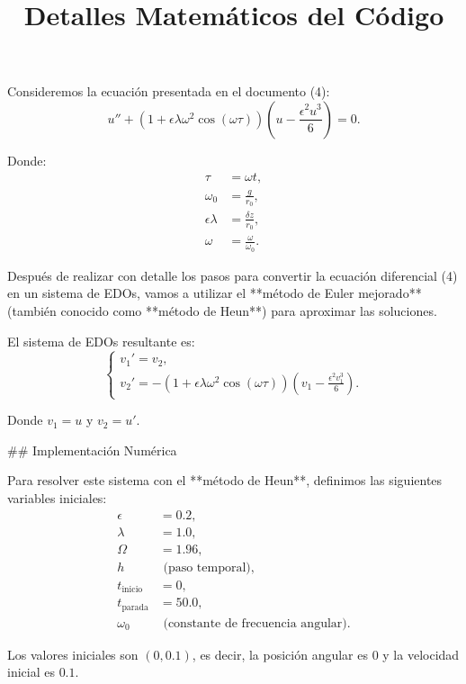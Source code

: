 \documentclass{article}
\title{Detalles Matemáticos del Código}
\author{}
\date{}
\begin{document}
\maketitle

Consideremos la ecuación presentada en el documento (4):
\begin{equation}
    u''+(1+\epsilon \lambda \omega^2 \cos(\omega \tau))\left(u - \frac{\epsilon^2 u^3}{6}\right) = 0.
\end{equation}

Donde:
\begin{align*}
    \tau &= \omega t, \\
    \omega_0 &= \frac{g}{r_0}, \\
    \epsilon \lambda &= \frac{\delta z}{r_0}, \\
    \omega &= \frac{\omega}{\omega_0}.
\end{align*}

Después de realizar con detalle los pasos para convertir la ecuación diferencial (4) en un sistema de EDOs, vamos a utilizar el **método de Euler mejorado** (también conocido como **método de Heun**) para aproximar las soluciones.

El sistema de EDOs resultante es:
\begin{equation}
    \begin{cases}
        v_1' = v_2,  \\
        v_2' = -(1+\epsilon \lambda \omega^2 \cos(\omega \tau))\left(v_1 - \frac{\epsilon^2 v_1^3}{6}\right).
    \end{cases}
\end{equation}

Donde $v_1 = u$ y $v_2 = u'$. 

## Implementación Numérica

Para resolver este sistema con el **método de Heun**, definimos las siguientes variables iniciales:
\begin{align*}
    \epsilon &= 0.2, \\
    \lambda &= 1.0, \\
    \Omega &= 1.96, \\
    h &\text{ (paso temporal)}, \\
    t_{\text{inicio}} &= 0, \\
    t_{\text{parada}} &= 50.0, \\
    \omega_0 &\text{ (constante de frecuencia angular)}.
\end{align*}

Los valores iniciales son $(0, 0.1)$, es decir, la posición angular es $0$ y la velocidad inicial es $0.1$.
\end{document}
